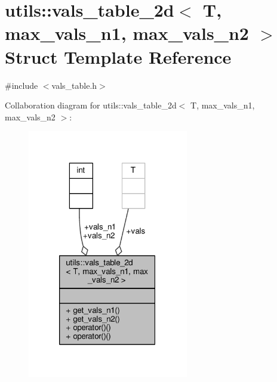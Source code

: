 \hypertarget{structutils_1_1vals__table__2d}{\section{utils\-:\-:vals\-\_\-table\-\_\-2d$<$ T, max\-\_\-vals\-\_\-n1, max\-\_\-vals\-\_\-n2 $>$ Struct Template Reference}
\label{structutils_1_1vals__table__2d}
}


{\ttfamily \#include $<$vals\-\_\-table.\-h$>$}



Collaboration diagram for utils\-:\-:vals\-\_\-table\-\_\-2d$<$ T, max\-\_\-vals\-\_\-n1, max\-\_\-vals\-\_\-n2 $>$\-:
\nopagebreak
\begin{figure}[H]
\begin{center}
\leavevmode
\includegraphics[width=199pt]{structutils_1_1vals__table__2d__coll__graph}
\end{center}
\end{figure}
